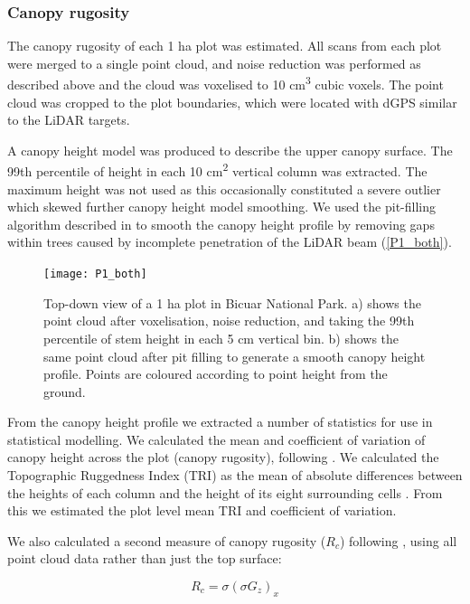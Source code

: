 \documentclass[11pt,a4paper]{article}
\begin{document}
\subsubsection{Canopy rugosity}

The canopy rugosity of each 1 ha plot was estimated. All scans from each plot were merged to a single point cloud, and noise reduction was performed as described above and the cloud was voxelised to 10 cm\textsuperscript{3} cubic voxels. The point cloud was cropped to the plot boundaries, which were located with dGPS similar to the LiDAR targets. 

A canopy height model was produced to describe the upper canopy surface. The 99th percentile of height in each 10 cm\textsuperscript{2} vertical column was extracted. The maximum height was not used as this occasionally constituted a severe outlier which skewed further 
canopy height model smoothing. We used the pit-filling algorithm described in \citet{Khosravipour2014} to smooth the canopy height profile by removing gaps within trees caused by incomplete penetration of the LiDAR beam (\autoref{P1_both}).

\begin{figure}[H]
\centering
	\texttt{[image: P1\_both]}
	\caption{Top-down view of a 1 ha plot in Bicuar National Park. a) shows the point cloud after voxelisation, noise reduction, and taking the 99th percentile of stem height in each 5 cm vertical bin. b) shows the same point cloud after pit filling to generate a smooth canopy height profile. Points are coloured according to point height from the ground.}
	\label{P1_both}
\end{figure}

From the canopy height profile we extracted a number of statistics for use in statistical modelling. We calculated the mean and coefficient of variation of canopy height across the plot (canopy rugosity), following \citep{Parker2004}. We calculated the Topographic Ruggedness Index (TRI) as the mean of absolute differences between the heights of each column and the height of its eight surrounding cells \citep{Wilson2007}. From this we estimated the plot level mean TRI and coefficient of variation. 

We also calculated a second measure of canopy rugosity ($R_{c}$) following \citet{Hardiman2011}, using all point cloud data rather than just the top surface:

\begin{equation}
	R_{c} = \sigma{}(\sigma{}G_{z})_{x}
\end{equation}
\end{document}
